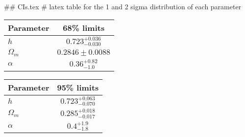 ## CIs.tex
# latex table for the 1 and 2 sigma distribution of each parameter

\begin{tabular} { l  c}
 Parameter &  68\% limits\\
\hline
{\boldmath$h              $} & $0.723^{+0.036}_{-0.030}   $\\
{\boldmath$\Omega_m       $} & $0.2846\pm 0.0088          $\\
{\boldmath$\alpha         $} & $0.36^{+0.82}_{-1.0}       $\\
\hline
\end{tabular}

\begin{tabular} { l  c}
 Parameter &  95\% limits\\
\hline
{\boldmath$h              $} & $0.723^{+0.063}_{-0.070}   $\\
{\boldmath$\Omega_m       $} & $0.285^{+0.018}_{-0.017}   $\\
{\boldmath$\alpha         $} & $0.4^{+1.9}_{-1.8}         $\\
\hline
\end{tabular}
